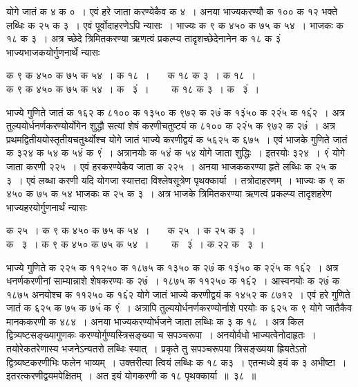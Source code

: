 \documentclass[11pt, openany]{book}
\begin{document}
\newpage

\begin{sloppypar}
\noindent योगे जातं क ४ क ०~। एवं हरे जाता करण्येकैव क ४~। अनया भाज्यकरण्यौ क १०० क १२ भक्ते लब्धिः क २५ क ३~। एवं पूर्वोदाहरणेऽपि न्यासः~। भाज्यः क ९ क ४५० क ७५ क ५४~। भाजकः क १८ क ३~। अत्र च्छेदे त्रिमितकरण्या ऋणत्वं प्रकल्प्य तादृशच्छेदेनानेन क १८ क ३ं भाज्यभाजकयोर्गुणनार्थे न्यासः 
\vspace{-2mm}

\begin{center}
क ९ क ४५० क ७५ क ५४~। क १८~। ~~~क १८ क ३~। क १८~। \\
क ९ क ४५० क ७५ क ५४~। क ~३ं~। ~~~~क १८ क ३~। क ~३ं~। 
\end{center}
\vspace{-2mm}

\noindent भाज्ये गुणिते जातं क १६२ क ८१०० क १३५० क ९७२ क २७ं क १३ं५० क २२ं५ क १६ं२~। अत्र तुल्ययोर्धनर्णकरण्योर्योगेन शुद्धौ सत्यां शेषं करणीचतुष्टयं क ८१०० क २२ं५ क ९७२ क २७ं~। अत्र प्रथमद्वितीययोस्तृतीयचतुर्थ्योश्च योगे जातं भाज्ये करणीद्वयं क ५६२५ क ६७५~। एवं भाजके गुणिते जातं क ३२४ क ५४ क ५४ं क ९ं~। अत्रानयोः क ५४ं क ५४ योगे जाता शुद्धिः~। इतरयोः ३२४~। ९ं योगे जाता करणी २२५~। एवं हरकरण्येकैव जाता क २२५~। अनया भाजककरण्या हृते लब्धिः क २५ क ३~। एवं लब्धा करणी यदि योगजा स्यात्तदा विश्लेषसूत्रेण पृथक्कार्या~। तत्रोदाहरणम्~। भाज्यः क ९ क ४५० क ७५ क ५४ भाजकः क २५ क ३~। अत्र भाजके त्रिमितकरण्या ऋणत्वं प्रकल्प्य तादृशहरेण भाज्यहरयोर्गुणनार्थं न्यासः
\vspace{-2mm}

\begin{center}
क २५~। क ९ क ४५० क ७५ क ५४~। ~~~क २५~। क २५ क ३~। \\
क ~\;३~। क ९ क ४५० क ७५ क ५४~। ~~~~क ~३ं~। क २२ क ~३~। 
\end{center}
\vspace{-2mm}

\noindent भाज्ये गुणिते क २२५ क ११२५० क १८७५ क १३५० क २७ं क १३ं५० क २२ं५ क १६ं२~। अत्र धनर्णकरणीनां साम्यान्नाशे शेषकरण्यः क २७ं~। १८७५ क ११२५० क १६ं२~। आस्वनयोः क २७ं क १८७५ अनयोश्च क ११२५० क १६ं२ योगे जातं भाज्ये करणीद्वयं क १४५२ क ८७१२~। एवं हरे गुणिते जातं क ६२५ क ७५ क ७५ं क ९ं~। अत्रापि तुल्ययोर्धनर्णकरण्योर्नाशे परयोः क ६२५ क ९ योगे जातैकैव मानककरणी क ४८४~। अनया भाज्यकरण्योर्भजने जाता लब्धिः क ३ क १८~। अत्र किल द्वित्र्यष्टसङ्ख्यागुणकः करण्योर्गुण्यस्त्रिसङ्ख्या च सपञ्चरूपा~। अनयोर्वधो भाज्यत्वेनोदाहृतः~। तयोरेकतरेणास्य भजनेऽन्यतरो लब्धिः स्यात्~। प्रकृते तु सपञ्चरूपया त्रिसङ्ख्यया ह्रियतेऽतो द्वित्र्यष्टकरणीभिः फलेन भाव्यम्~। उक्तरीत्या त्वियं लब्धिः क १८ क३~। एतन्मध्ये इयं क ३ अभीष्टा~। इतरत्करणीद्वयमपेक्षितम्~। अत इयं योगकरणी क १८ पृथक्कार्या~॥~३८~॥
\end{sloppypar}
\end{document}

